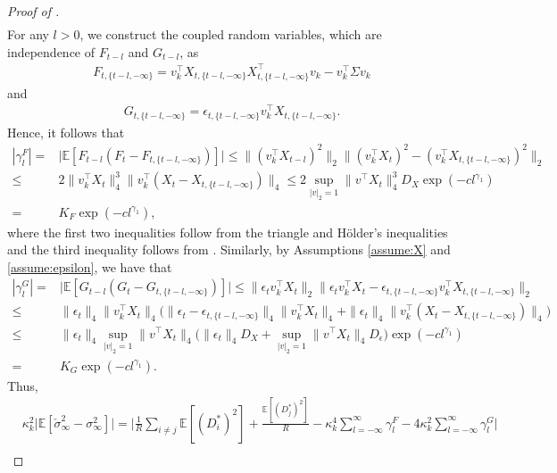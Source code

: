 \documentclass[11pt]{article}
\theoremstyle{plain}
\theoremstyle{definition}
\begin{document}
\begin{proof}[Proof of ]
\begin{align*}
\end{align*}
For any $l > 0$, we construct the coupled random variables, which are independence of $F_{t-l}$ and $G_{t-l}$, as 
\begin{align*}
    F_{t, \{t-l, - \infty\}} = v_k^{\top}X_{t, \{t-l, - \infty\}}X_{t, \{t-l, - \infty\}}^{\top}v_k - v_k^{\top}\Sigma v_k
\end{align*}
and
\begin{align*}
    G_{t, \{t-l, - \infty\}} = \epsilon_{t, \{t-l, - \infty\}}v_k^{\top}X_{t, \{t-l, - \infty\}}.
\end{align*}
Hence, it follows that
\begin{align*}
    |\gamma_l^F| =& \big| \mathbb{E}[F_{t-l}(F_{t} - F_{t,\{t-l,-\infty\}})] \big| \leq \big\|(v_k^{\top}X_{t-l})^2\big\|_2\big\|(v_k^{\top}X_{t})^2 - (v_k^{\top}X_{t,\{t-l,-\infty\}})^2\big\|_2\\
    \leq& 2\big\|v_k^{\top}X_{t}\big\|_4^3\big\|v_k^{\top}(X_{t} - X_{t,\{t-l,-\infty\}})\big\|_4 \leq 2\sup_{|v|_2 = 1}\|v^{\top}X_{t}\|_4^3D_X\exp(-cl^{\gamma_1})\\
    =& K_F\exp(-cl^{\gamma_1}),
\end{align*}
where the first two inequalities follow from the triangle and H\"older's inequalities and the third inequality follows from . Similarly, by Assumptions \ref{assume:X} and \ref{assume:epsilon}, we have that
\begin{align*}
    |\gamma_l^G| =& \big| \mathbb{E}[G_{t-l}(G_{t} - G_{t,\{t-l,-\infty\}})] \big| \leq \big\|\epsilon_{t}v_k^{\top}X_{t}\big\|_2\big\|\epsilon_{t}v_k^{\top}X_{t} - \epsilon_{t, \{t-l, - \infty\}}v_k^{\top}X_{t, \{t-l, - \infty\}}\big\|_2\\
    \leq& \|\epsilon_t\|_4\big\|v_k^{\top}X_{t}\big\|_4\big(\|\epsilon_t - \epsilon_{t, \{t-l,-\infty\}}\|_4\big\|v_k^{\top}X_{t}\big\|_4 +\|\epsilon_t\|_4\big\|v_k^{\top}(X_{t} - X_{t,\{t-l,-\infty\}})\big\|_4\big)\\
    \leq& \|\epsilon_t\|_4\sup_{|v|_2 = 1}\|v^{\top}X_{t}\|_4\Big(\|\epsilon_t\|_4D_{X}+\sup_{|v|_2 = 1}\|v^{\top}X_{t}\|_4D_{\epsilon}\Big)\exp(-cl^{\gamma_1})\\
    =& K_G\exp(-cl^{\gamma_1}).
\end{align*}
Thus,
 \begin{align}\label{eq:LRV_L1}
    &\kappa_k^2\big|\mathbb{E}[\check{\sigma}_{\infty}^2 - \sigma_{\infty}^2]\big| = \bigg|\frac{1}{R}\sum_{i \neq j}\mathbb{E}[(D_i^*)^2] + \frac{\mathbb{E}[(D_j^*)^2]}{R} - \kappa_k^4\sum_{l = -\infty}^{\infty}\gamma_l^F - 4\kappa_k^2\sum_{l = -\infty}^{\infty}\gamma_l^G\bigg| \nonumber\\

\end{align}
\end{proof}
\end{document}
